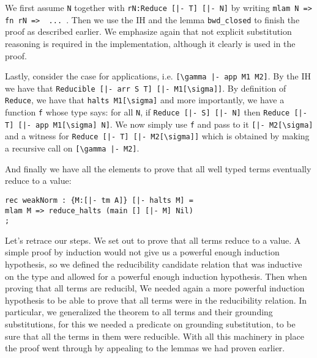We first assume \lstinline!N! together with
\lstinline!rN:Reduce [|- T] [|- N]! by writing 
\lstinline!mlam N => fn rN =>  ... !. Then we use the IH and the lemma
\lstinline!bwd_closed! to finish the proof as described earlier. We
emphasize again that not explicit substitution reasoning is required
in the implementation, although it clearly is used in the proof.

Lastly, consider the case for applications, i.e. 
\lstinline![\gamma |- app M1 M2]!. By the IH we have that 
\lstinline!Reducible [|- arr S T] [|- M1[\sigma]]!. By definition of
\lstinline!Reduce!, we have that \lstinline!halts M1[\sigma]! and more
importantly, we have a function \lstinline!f! whose type says:
for all \lstinline!N!, if 
\lstinline!Reduce [|- S] [|- N]! then 
\lstinline!Reduce [|- T] [|- app M1[\sigma] N]!. 
%
We now simply use \lstinline!f! and pass to it 
\lstinline![|- M2[\sigma]! and a witness for 
\lstinline!Reduce [|- T] [|- M2[\sigma]]! which
is obtained by making a recursive call on 
\lstinline![\gamma |- M2]!.



And finally we have all the elements to prove that all well typed
terms eventually reduce to a value:
\begin{lstlisting}
rec weakNorm : {M:[|- tm A]} [|- halts M] =
mlam M => reduce_halts (main [] [|- M] Nil)
;
\end{lstlisting}

Let's retrace our steps. We set out to prove that all terms reduce to a
value. A simple proof by induction would not give us a powerful enough
induction hypothesis, so we defined the reducibility candidate
relation that was inductive on the type and allowed for a powerful enough
induction hypothesis. Then when proving that all terms are reducibl, We needed again a more powerful induction
hypothesis to be able to prove that all terms were in the reducibility
relation. In particular, we generalized the theorem to all terms and
their grounding substitutions, for this we needed a predicate on
grounding substitution, to be sure that all the terms in them were
reducible. With all this machinery in place the proof went through by
appealing to the lemmas we had proven earlier.

